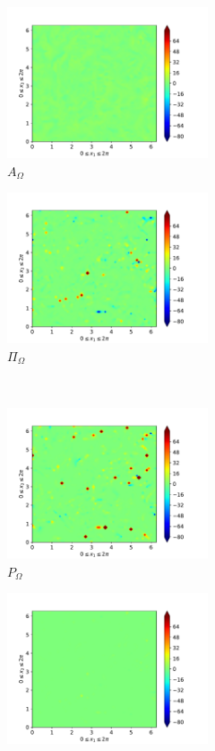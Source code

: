\begin{figure}[H]
\begin{subfigure}{0.45\textwidth}
        \includegraphics[height=1.75in]{media/run-cds-65/A-enst-1360}
        \caption{$A_{\Omega}$}
    \end{subfigure}
    \newline
    \begin{subfigure}{0.45\textwidth}
        \includegraphics[height=1.75in]{media/run-cds-65/Pi-enst-1360}
        \caption{$\Pi_{\Omega}$}
    \end{subfigure}
    ~
    \begin{subfigure}{0.45\textwidth}
        \includegraphics[height=1.75in]{media/run-cds-65/P-enst-1360}
        \caption{$P_{\Omega}$}
    \end{subfigure}
    \newline
    \begin{subfigure}{0.45\textwidth}
        \includegraphics[height=1.75in]{media/run-cds-65/B-enst-1360}

\end{subfigure}
\end{figure}
